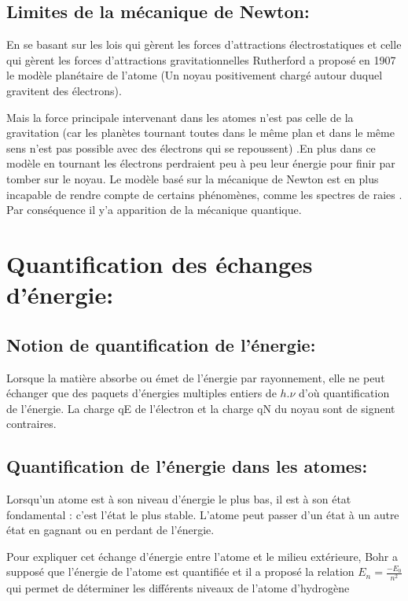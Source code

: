 \documentclass[12pt]{article}
\begin{document}
\subsection{Limites de la mécanique de Newton:}
En se basant sur les lois qui gèrent les forces d'attractions électrostatiques et celle qui gèrent les forces d'attractions
gravitationnelles Rutherford a proposé en 1907 le modèle planétaire de l'atome (Un noyau positivement chargé autour duquel
gravitent des électrons).



Mais la force principale intervenant dans les atomes n'est pas celle de la gravitation (car les planètes tournant toutes dans le
même plan et dans le même sens n'est pas possible avec des électrons qui se repoussent) .En plus dans ce modèle en tournant les
électrons perdraient peu à peu leur énergie pour finir par tomber sur le noyau. Le modèle basé sur la mécanique de Newton est en
plus incapable de rendre compte de certains phénomènes, comme les spectres de raies . Par conséquence il y'a apparition de la
mécanique quantique.

\section{Quantification des échanges d'énergie:}
\subsection{Notion de quantification de l'énergie:}
Lorsque la matière absorbe ou émet de l'énergie par rayonnement, elle ne peut échanger que des paquets d'énergies multiples
entiers de $h.\nu$ d’où quantification de l'énergie.
La charge qE de l'électron et la charge qN du noyau sont de signent contraires.

\subsection{Quantification de l'énergie dans les atomes:}
Lorsqu'un atome est à son niveau d'énergie le plus bas, il est à son état fondamental : c'est l'état le plus stable.
L'atome peut passer d'un état à un autre état en gagnant ou en perdant de l'énergie.

Pour expliquer cet échange d'énergie entre l'atome et le milieu extérieure, Bohr a supposé que l'énergie de l'atome est quantifiée et
il a proposé la relation $E_n = \frac{-E_0 }{n^2}$ qui permet de déterminer les différents niveaux de l'atome d'hydrogène
\end{document}
